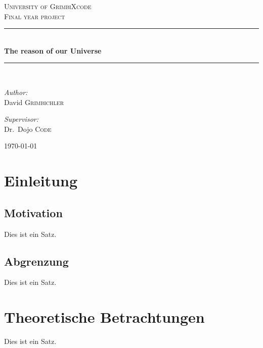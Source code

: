 \documentclass[a4paper, 11pt]{article}
\begin{document}
	\begin{titlepage}

		\begin{center}
			\textsc{\LARGE University of GrimbiXcode}\\[1.5cm]
			\textsc{\Large Final year project}\\[0.5cm]

			\newcommand{\HRule}{\rule{\linewidth}{0.5mm}}
			\HRule \\[0.4cm]
			{ \huge \bfseries The reason of our Universe}\\[0.4cm]
			\HRule \\[1.5cm]
			\begin{minipage}{0.4\textwidth}
				\begin{flushleft} \large
					\emph{Author:}\\
					David \textsc{Grimbichler}
				\end{flushleft}
			\end{minipage}
			\hfill
			\begin{minipage}{0.4\textwidth}
				\begin{flushright} \large
					\emph{Supervisor:} \\
					Dr.~Dojo \textsc{Code}
				\end{flushright}
			\end{minipage}
			\vfill
			{\large \today}

		\end{center}
	\end{titlepage}

\tableofcontents

\newpage

\section{Einleitung}

\subsection{Motivation}

Dies ist ein Satz.

\subsection{Abgrenzung}

Dies ist ein Satz.

\newpage

\section{Theoretische Betrachtungen}

Dies ist ein Satz.

\end{document}
